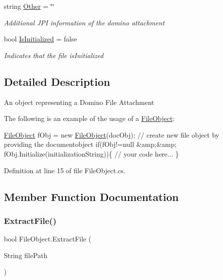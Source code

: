 \begin{DoxyCompactItemize}
string \mbox{\hyperlink{class_file_object_ab91b5eca56a04784f8d0187247e1280c}{Other}} = \char`\"{}\char`\"{}
\begin{DoxyCompactList}\small\item\em Additional J\+PI information of the domino attachment \end{DoxyCompactList}\item 
bool \mbox{\hyperlink{class_file_object_a36ff6c07d0662885402bfe7d98cf2988}{Is\+Initialized}} = false
\begin{DoxyCompactList}\small\item\em Indicates that the file is\+Initialized \end{DoxyCompactList}\end{DoxyCompactItemize}


\subsection{Detailed Description}
An object representing a Domino File Attachment 

The following is an example of the usage of a {\ttfamily \mbox{\hyperlink{class_file_object}{File\+Object}}}\+: 
\begin{DoxyCode}
\mbox{\hyperlink{class_file_object}{FileObject}} fObj = \textcolor{keyword}{new} \mbox{\hyperlink{class_file_object}{FileObject}}(docObj); \textcolor{comment}{// create new file object by providing the
       documentobject}
\textcolor{keywordflow}{if}(fObj!=null &amp;&amp; fObj.Initialize(initializationString))\{
     \textcolor{comment}{// your code here...}
\}
\end{DoxyCode}
 

Definition at line 15 of file File\+Object.\+cs.



\subsection{Member Function Documentation}
\mbox{\label{class_file_object_ae21fac09c5ab2f9fac96a3f084cb9ddc}} 
\subsubsection{\texorpdfstring{Extract\+File()}{ExtractFile()}}
{\footnotesize\ttfamily bool File\+Object.\+Extract\+File (\begin{DoxyParamCaption}\item[{String}]{file\+Path }\end{DoxyParamCaption})}



